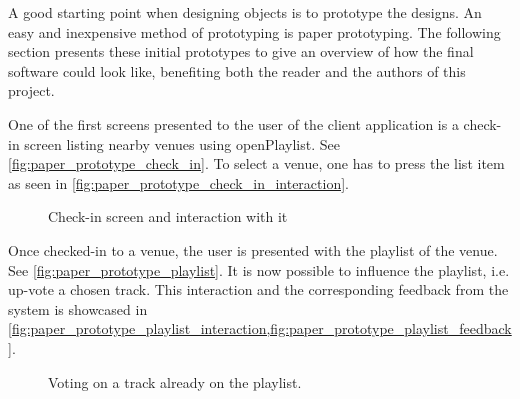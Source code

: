 \label{paper_prototype}
A good starting point when designing objects is to prototype the
designs. An easy and inexpensive method of prototyping is paper
prototyping. The following section presents these initial prototypes
to give an overview of how the final software could look like,
benefiting both the reader and the authors of this project.

One of the first screens presented to the user of the client
application is a check-in screen listing nearby venues using
openPlaylist. See \cref{fig:paper_prototype_check_in}. To select a
venue, one has to press the list item as seen in \cref{fig:paper_prototype_check_in_interaction}.

\begin{figure}[h!]
  \centering
  \caption{Check-in screen and interaction with it}
\end{figure}


Once checked-in to a venue, the user is presented with the playlist of
the venue. See \cref{fig:paper_prototype_playlist}. It is now possible
to influence the playlist, i.e. up-vote a chosen track. This
interaction and the corresponding feedback from the system is showcased in
\cref{fig:paper_prototype_playlist_interaction,fig:paper_prototype_playlist_feedback}.

\begin{figure}[h!]
  \centering
  \caption{Voting on a track already on the playlist.}
\end{figure}

